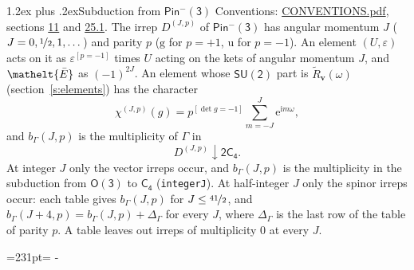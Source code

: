 \documentclass[10pt,a4paper]{article}
\makeatletter
\renewcommand\section{\@startsection{section}{1}{\z@}{-3ex plus -1ex minus -.2ex}%
  {1.2ex plus .2ex}{\normalfont\large\sffamily\bfseries\color{parttitle}}}
\newcommand{\needspace}[1]{\par\penalty-100\begingroup\dimen0=#1\relax\dimen2=\pagegoal
  \advance\dimen2-\pagetotal\ifdim\dimen0>\dimen2\relax\ifdim\dimen2>0pt\vfil\break\fi\fi
  \endgroup}
\numberwithin{equation}{section}
\newcommand{\eltfont}[1]{{\let\sigma\eltsigma\mathelt{#1}}}
\newcommand{\grp}[1]{\mathsf{#1}}
\newcommand{\elt}[1]{\eltfont{#1}}
\newcommand{\ptag}[1]{\mathrm{#1}}
\newcommand{\iverson}[1]{[#1]}
\newcommand{\restr}[2]{#1\!\downarrow#2}
\newcommand{\vv}{\mathbf{v}}
\newcommand{\iunit}{\mathrm{i}}
\newcommand{\expe}{\mathrm{e}}
\newcommand{\irrJp}[2]{D^{(#1,#2)}}
\newcommand{\barred}[1]{\bar{#1}}
\newcommand{\lift}[1]{\tilde{#1}}
\makeatother
\begin{document}
\section{Subduction from \texorpdfstring{$\grp{Pin^{-}(3)}$}{Pin(3)}}\label{s:subduction_parent}
Conventions: \href{../../CONVENTIONS.pdf}{CONVENTIONS.pdf}, sections \href{../../../rotation/CONVENTIONS.pdf\#conv.11}{11} and \href{../../CONVENTIONS.pdf\#conv.25.1}{25.1}.
\leavevmode\label{n:index.J}\label{n:index.parity}\label{n:irrep.o3}The irrep $\irrJp{J}{p}$ of \href{Pinminus3.pdf}{$\grp{Pin^{-}(3)}$} has angular momentum $J$ ($J = 0, \nicefrac{1}{2}, 1, \dots$) and parity $p$ ($\ptag{g}$ for $p = +1$, $\ptag{u}$ for $p = -1$). An element $(U, \varepsilon)$ acts on it as $\varepsilon^{[p = -1]}$ times $U$ acting on the kets of angular momentum $J$, and $\elt{\barred{E}}$ as $(-1)^{2J}$. \label{n:function.character.parent}\label{n:function.multiplicity}An element whose $\grp{SU(2)}$ part is $\lift{R}_{\vv}(\omega)$ (section~\ref{s:elements}) has the character
\begin{equation}\label{e:chi}\chi^{(J,p)}(g) = p^{\iverson{\det g = -1}}\sum_{m=-J}^{J} \expe^{\iunit m\omega},\end{equation}
and $b_\Gamma(J, p)$ is the multiplicity of $\Gamma$ in
\begin{equation}\label{e:parent}\restr{\irrJp{J}{p}}{\grp{2C_{4}}}.\end{equation}
At integer $J$ only the vector irreps occur, and $b_\Gamma(J, p)$ is the multiplicity in the subduction from $\grp{O(3)}$ to \href{../../../rotation/data/pdf/C4.pdf}{$\grp{C_{4}}$} (\texttt{integerJ}). \label{n:index.increment}At half-integer $J$ only the spinor irreps occur: each table gives $b_\Gamma(J, p)$ for $J \le \nicefrac{41}{2}$, and $b_\Gamma(J + 4, p) = b_\Gamma(J, p) + \Delta_\Gamma$ for every $J$, where $\Delta_\Gamma$ is the last row of the table of parity $p$. A table leaves out irreps of multiplicity 0 at every $J$.
\needspace{231pt}
\end{document}
